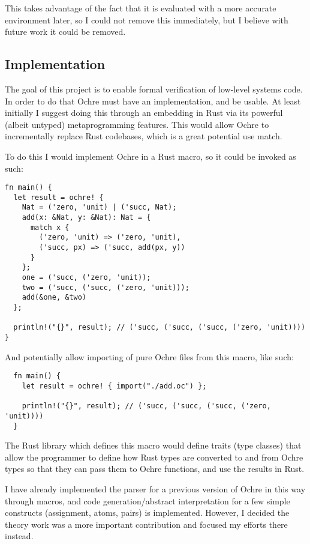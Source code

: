 \documentclass[12pt,twoside]{report}
\begin{document}
This takes advantage of the fact that it is evaluated with a more accurate environment later, so I could not remove this immediately, but I believe with future work it could be removed.

\subsection{Implementation}
The goal of this project is to enable formal verification of low-level systems code. In order to do that Ochre must have an implementation, and be usable. At least initially I suggest doing this through an embedding in Rust via its powerful (albeit untyped) metaprogramming features. This would allow Ochre to incrementally replace Rust codebases, which is a great potential use match.

To do this I would implement Ochre in a Rust macro, so it could be invoked as such:

\begin{verbatim}
fn main() {
  let result = ochre! {
    Nat = ('zero, 'unit) | ('succ, Nat);
    add(x: &Nat, y: &Nat): Nat = {
      match x {
        ('zero, 'unit) => ('zero, 'unit),
        ('succ, px) => ('succ, add(px, y))
      }
    };
    one = ('succ, ('zero, 'unit));
    two = ('succ, ('succ, ('zero, 'unit)));
    add(&one, &two)
  };

  println!("{}", result); // ('succ, ('succ, ('succ, ('zero, 'unit))))
}
\end{verbatim}

And potentially allow importing of pure Ochre files from this macro, like such:

\begin{verbatim}
  fn main() {
    let result = ochre! { import("./add.oc") };
  
    println!("{}", result); // ('succ, ('succ, ('succ, ('zero, 'unit))))
  }
\end{verbatim}

The Rust library which defines this macro would define traits (type classes) that allow the programmer to define how Rust types are converted to and from Ochre types so that they can pass them to Ochre functions, and use the results in Rust.

I have already implemented the parser for a previous version of Ochre in this way through macros, and code generation/abstract interpretation for a few simple constructs (assignment, atoms, pairs) is implemented. However, I decided the theory work was a more important contribution and focused my efforts there instead.
\end{document}
